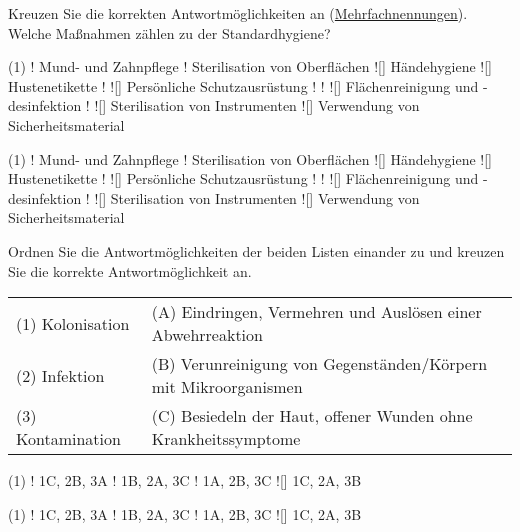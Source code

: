 \documentclass[a4paper]{scrartcl}
\begin{document}
\begin{aufgabe}{6}
	Kreuzen Sie die korrekten Antwortmöglichkeiten an (\underline{Mehrfachnennungen}). Welche Maßnahmen zählen zu der Standardhygiene?
	\begin{center}
		\begin{mcumgebung}(1)
			\choice! Mund- und Zahnpflege
			\choice! Sterilisation von Oberflächen
			\choice![\mcrichtig] Händehygiene 
			\choice![\mcrichtig] Hustenetikette
			\choice! 
			\choice![\mcrichtig] Persönliche Schutzausrüstung
			\choice!
			\choice!
			\choice![\mcrichtig] Flächenreinigung und -desinfektion
			\choice!
			\choice![\mcrichtig] Sterilisation von Instrumenten
			\choice![\mcrichtig] Verwendung von Sicherheitsmaterial
		\end{mcumgebung}
	\end{center}
	
	\begin{loesung}
		\begin{mcumgebung}(1)
			\choice! Mund- und Zahnpflege
			\choice! Sterilisation von Oberflächen
			\choice![\mcrichtig] Händehygiene 
			\choice![\mcrichtig] Hustenetikette
			\choice! 
			\choice![\mcrichtig] Persönliche Schutzausrüstung
			\choice!
			\choice!
			\choice![\mcrichtig] Flächenreinigung und -desinfektion
			\choice!
			\choice![\mcrichtig] Sterilisation von Instrumenten
			\choice![\mcrichtig] Verwendung von Sicherheitsmaterial
		\end{mcumgebung}
	\end{loesung}
\end{aufgabe}






\begin{aufgabe}{2}
	Ordnen Sie die Antwortmöglichkeiten der beiden Listen einander zu und kreuzen Sie die korrekte Antwortmöglichkeit an.
	
	\vspace{1em}
	\begin{tabular}{ll}
		(1) Kolonisation  & (A) Eindringen, Vermehren und Auslösen einer Abwehrreaktion\\
		(2) Infektion & (B) Verunreinigung von Gegenständen/Körpern mit Mikroorganismen\\
		(3) Kontamination & (C) Besiedeln der Haut, offener Wunden ohne Krankheitssymptome\\
	\end{tabular}
	
	
	\begin{mcumgebung}(1)
		\choice! 1C, 2B, 3A
		\choice! 1B, 2A, 3C
		\choice! 1A, 2B, 3C
		\choice![\mcrichtig] 1C, 2A, 3B
	\end{mcumgebung}
	
	\begin{loesung}
		\begin{mcumgebung}(1)
		\choice! 1C, 2B, 3A
		\choice! 1B, 2A, 3C
		\choice! 1A, 2B, 3C
		\choice![\mcrichtig] 1C, 2A, 3B
		\end{mcumgebung}
	\end{loesung}
\end{aufgabe}
\end{document}
